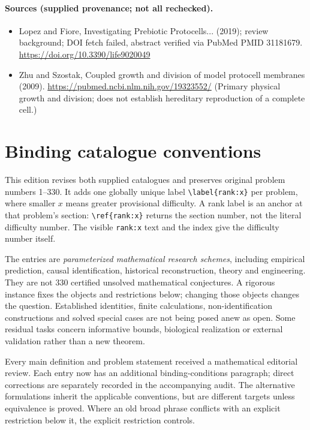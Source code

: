 \documentclass[11pt]{article}
\begin{document}
\paragraph{Sources (supplied provenance; not all rechecked).} \begin{itemize}
\item Lopez and Fiore, Investigating Prebiotic Protocells... (2019); review background; DOI fetch failed, abstract verified via PubMed PMID 31181679. \url{https://doi.org/10.3390/life9020049}
\item Zhu and Szostak, Coupled growth and division of model protocell membranes (2009). \url{https://pubmed.ncbi.nlm.nih.gov/19323552/} (Primary physical growth and division; does not establish hereditary reproduction of a complete cell.)
\end{itemize}


\section*{Binding catalogue conventions}
This edition revises both supplied catalogues and preserves original problem numbers 1--330. It adds one globally unique label \verb|\label{rank:x}| per problem, where smaller $x$ means greater provisional difficulty. A rank label is an anchor at that problem's section: \verb|\ref{rank:x}| returns the section number, not the literal difficulty number. The visible \texttt{rank:x} text and the index give the difficulty number itself.

The entries are \emph{parameterized mathematical research schemes}, including empirical prediction, causal identification, historical reconstruction, theory and engineering. They are not 330 certified unsolved mathematical conjectures. A rigorous instance fixes the objects and restrictions below; changing those objects changes the question. Established identities, finite calculations, non-identification constructions and solved special cases are not being posed anew as open. Some residual tasks concern informative bounds, biological realization or external validation rather than a new theorem.

Every main definition and problem statement received a mathematical editorial review. Each entry now has an additional binding-conditions paragraph; direct corrections are separately recorded in the accompanying audit. The alternative formulations inherit the applicable conventions, but are different targets unless equivalence is proved. Where an old broad phrase conflicts with an explicit restriction below it, the explicit restriction controls.
\end{document}
